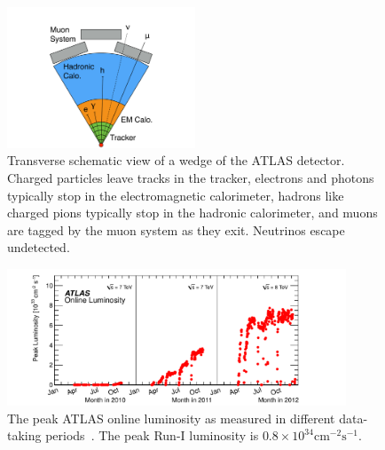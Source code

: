 \begin{figure}[tp]
  \centering
  \includegraphics[width=0.5\textwidth]{figures/lhc-atlas/atlas-wedge-cartoon}
  \caption{Transverse schematic view of a wedge of the ATLAS detector. Charged particles leave tracks in the tracker, electrons and photons typically stop in the electromagnetic calorimeter, hadrons like charged pions typically stop in the hadronic calorimeter, and muons are tagged by the muon system as they exit. Neutrinos escape undetected.}
  \label{fig:atlas-wedge}
\end{figure}

\begin{figure}[tp]
  \centering
  \includegraphics[width=0.90\textwidth]{figures/lhc-atlas/lumivstime}
  \caption{The peak ATLAS online luminosity as measured in different data-taking periods~\cite{atlas-lumi}. The peak Run-I luminosity is $0.8\times 10^{34} \text{cm}^{-2} \text{s}^{-1}$.}
  \label{fig:atlas-lumi-1}
\end{figure}

